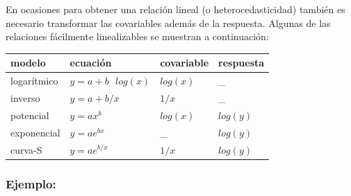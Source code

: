 \documentclass[]{book}
\begin{document}
En ocasiones para obtener una relación lineal (o heterocedasticidad) también es
necesario transformar las covariables además de la respuesta. Algunas de
las relaciones fácilmente linealizables se muestran a continuación:

\begin{longtable}[]{@{}llll@{}}
\toprule
modelo & ecuación & covariable & respuesta\tabularnewline
\midrule
\endhead
logarítmico & \(y = a + b\text{ }log(x)\) & \(log(x)\) & \_\tabularnewline
inverso & \(y = a + b/x\) & \(1/x\) & \_\tabularnewline
potencial & \(y = ax^b\) & \(log(x)\) & \(log(y)\)\tabularnewline
exponencial & \(y = ae^{bx}\) & \_ & \(log(y)\)\tabularnewline
curva-S & \(y = ae^{b/x}\) & \(1/x\) & \(log(y)\)\tabularnewline
\bottomrule
\end{longtable}

\hypertarget{ejemplo-1}{%
\subsubsection{Ejemplo:}\label{ejemplo-1}}
\end{document}

